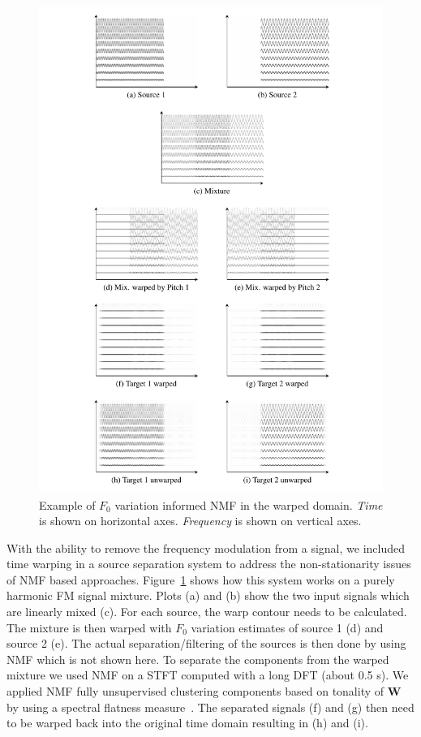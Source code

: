 \begin{figure}
  \includegraphics[width=\textwidth]{Chapters/05_Separation_Known/figures/toy.pdf}
\caption{Example of $F_0$ variation informed NMF in the warped domain. \textit{Time} is shown on horizontal axes. \textit{Frequency} is shown on vertical axes.}%
\label{fig:warpingdemo}
\end{figure}

With the ability to remove the frequency modulation from a signal, we included time warping in a source separation system to address the non-stationarity issues of NMF based approaches. 
Figure~\ref{fig:warpingdemo} shows how this system works on a purely harmonic FM signal mixture. 
Plots (a) and (b) show the two input signals which are linearly mixed (c). 
For each source, the warp contour needs to be calculated. 
The mixture is then warped with $F_0$ variation estimates of source 1 (d) and source 2 (e). 
The actual separation/filtering of the sources is then done by using NMF which is not shown here. 
To separate the components from the warped mixture we used NMF on a STFT computed with a long DFT (about 0.5 s). 
We applied NMF fully unsupervised clustering components based on tonality of $\textbf{W}$ by using a spectral flatness measure~\cite{gray74}. The separated signals (f) and (g) then need to be warped back into the original time domain resulting in (h) and (i).

